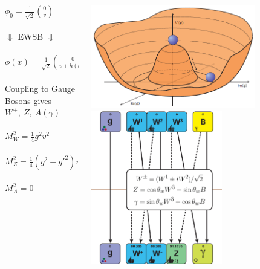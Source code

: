 \documentclass{beamer}
\newcommand*{\header}[1]{\fontsize{16}{8}\selectfont \textbf{{\color{MyPurple}{#1}}}}
\begin{document}
\begin{frame}
\begin{center}
\header{Higgs Mechanism}
\end{center}
\begin{columns}
\begin{column}{0.5\textwidth}
\color{MyPurple}{Scalar Boson}\color{black}
\begin{center}
$\phi_0 = \frac{1}{\sqrt{2}}\binom{0}{v}$\\~\\
\huge$\Downarrow$ \normalsize EWSB \huge$\Downarrow$ \normalsize\\~\\
$\phi(x) = \frac{1}{\sqrt{2}}\binom{0}{v + h(x)}$\\~\\
Coupling to Gauge Bosons gives $W^{\pm},\ Z,\ A(\gamma)$\\~\\
$M_W^2 = \frac{1}{4}g^2v^2$\\~\\
\vspace{-0.3cm}$M_Z^2 = \frac{1}{4}(g^2 + g'^{2})v^2$\\~\\
\vspace{-0.3cm}$M_A^2 = 0$
\end{center}
\end{column}
\begin{column}{0.5\textwidth}
\begin{center}
\includegraphics[width=0.75\textwidth]{figures/higgspotential}\\
\includegraphics[width=0.6\textwidth]{figures/Higgs_mech}

\end{center}
\end{column}
\end{columns}
\end{frame}
\end{document}
